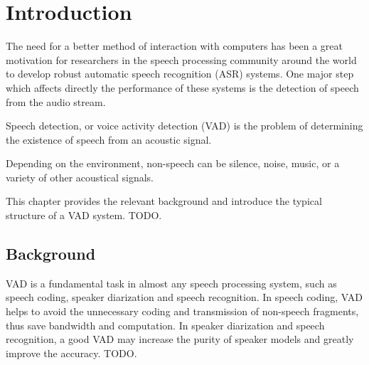\chapter{Introduction}
\label{chap:introduction}

The need for a better method of interaction with computers has been a great motivation for researchers in the speech processing community around the world to develop robust automatic speech recognition (ASR) systems. One major step which affects directly the performance of these systems is the detection of speech from the audio stream.

Speech detection, or voice activity detection (VAD) is the problem of determining the existence of speech from an acoustic signal.

Depending on the environment, non-speech can be silence, noise, music, or a variety of other acoustical signals.

This chapter provides the relevant background and introduce the typical structure of a VAD system. TODO.

\section{Background}
VAD is a fundamental task in almost any speech processing system, such as speech coding, speaker diarization and speech recognition. In speech coding, VAD helps to avoid the unnecessary coding and transmission of non-speech fragments, thus save bandwidth and computation. In speaker diarization and speech recognition, a good VAD may increase the purity of speaker models and greatly improve the accuracy. TODO.



